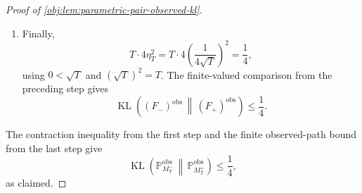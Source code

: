 \begin{proof}[Proof of \cref{obj:lem:parametric-pair-observed-kl}]
\begin{enumerate}
\item
Finally,
\[
T\cdot 4\eta_T^2
=
T\cdot 4\left(\frac{1}{4\sqrt T}\right)^2
=
\frac14,
\]
using \(0<\sqrt T\) and \((\sqrt T)^2=T\).  The finite-valued comparison from the preceding step gives
\[
\operatorname{KL}\!\left(
(F_-)^{\mathrm{obs}}
\,\middle\|\,
(F_+)^{\mathrm{obs}}
\right)
\le
\frac14.
\] %
\end{enumerate}

The contraction inequality from the first step and the finite observed-path bound from the last step
give
\[
\operatorname{KL}\!\left(
\mathbb P^{\mathrm{obs}}_{M_T^-}
\,\middle\|\,
\mathbb P^{\mathrm{obs}}_{M_T^+}
\right)
\le
\frac14,
\]
as claimed. %
\end{proof}
